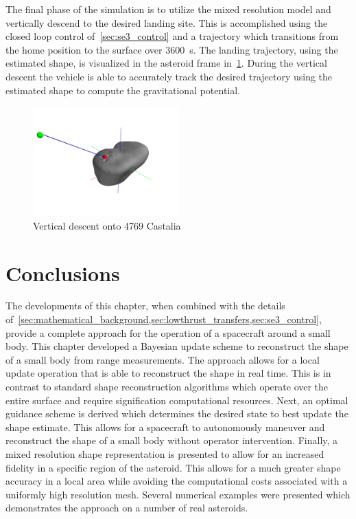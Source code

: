 \documentclass[letterpaper, paper,11pt]{AAS}		%
\begin{document}
The final phase of the simulation is to utilize the mixed resolution model and vertically descend to the desired landing site. 
This is accomplished using the closed loop control of~\cref{sec:se3_control} and a trajectory which transitions from the home position to the surface over \SI{3600}{\second}.
The landing trajectory, using the estimated shape, is visualized in the asteroid frame in~\cref{fig:castalia_landing}.
During the vertical descent the vehicle is able to accurately track the desired trajectory using the estimated shape to compute the gravitational potential.
\begin{figure}[htbp]
    \centering
    \includegraphics[width=0.5\textwidth]{figures/dynamic_exploration/castalia/land/asteroid_trajectory.jpg}
    \caption{Vertical descent onto 4769 Castalia~\label{fig:castalia_landing}}
\end{figure}

\section{Conclusions}

The developments of this chapter, when combined with the details of~\cref{sec:mathematical_background,sec:lowthrust_transfers,sec:se3_control}, provide a complete approach for the operation of a spacecraft around a small body.
This chapter developed a Bayesian update scheme to reconstruct the shape of a small body from range measurements. 
The approach allows for a local update operation that is able to reconstruct the shape in real time. 
This is in contrast to standard shape reconstruction algorithms which operate over the entire surface and require signification computational resources.
Next, an optimal guidance scheme is derived which determines the desired state to best update the shape estimate. 
This allows for a spacecraft to autonomously maneuver and reconstruct the shape of a small body without operator intervention.
Finally, a mixed resolution shape representation is presented to allow for an increased fidelity in a specific region of the asteroid.
This allows for a much greater shape accuracy in a local area while avoiding the computational costs associated with a uniformly high resolution mesh.
Several numerical examples were presented which demonstrates the approach on a number of real asteroids.

 

\end{document}
